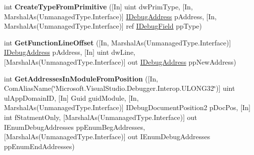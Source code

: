 \begin{DoxyCompactItemize}
\item 
\hypertarget{interface_microsoft_1_1_visual_studio_1_1_debugger_1_1_interop_e_e_1_1_i_debug_com_plus_symbol_provider2_a9f2c354a0835cdd9ece697068c752665}{int {\bfseries Create\+Type\+From\+Primitive} (\mbox{[}In\mbox{]} uint dw\+Prim\+Type, \mbox{[}In, Marshal\+As(Unmanaged\+Type.\+Interface)\mbox{]} \hyperlink{interface_microsoft_1_1_visual_studio_1_1_debugger_1_1_interop_e_e_1_1_i_debug_address}{I\+Debug\+Address} p\+Address, \mbox{[}In, Marshal\+As(Unmanaged\+Type.\+Interface)\mbox{]} ref \hyperlink{interface_microsoft_1_1_visual_studio_1_1_debugger_1_1_interop_e_e_1_1_i_debug_field}{I\+Debug\+Field} pp\+Type)}\label{interface_microsoft_1_1_visual_studio_1_1_debugger_1_1_interop_e_e_1_1_i_debug_com_plus_symbol_provider2_a9f2c354a0835cdd9ece697068c752665}

\item 
\hypertarget{interface_microsoft_1_1_visual_studio_1_1_debugger_1_1_interop_e_e_1_1_i_debug_com_plus_symbol_provider2_ae990ad27eb15d414caa6cee6a966d861}{int {\bfseries Get\+Function\+Line\+Offset} (\mbox{[}In, Marshal\+As(Unmanaged\+Type.\+Interface)\mbox{]} \hyperlink{interface_microsoft_1_1_visual_studio_1_1_debugger_1_1_interop_e_e_1_1_i_debug_address}{I\+Debug\+Address} p\+Address, \mbox{[}In\mbox{]} uint dw\+Line, \mbox{[}Marshal\+As(Unmanaged\+Type.\+Interface)\mbox{]} out \hyperlink{interface_microsoft_1_1_visual_studio_1_1_debugger_1_1_interop_e_e_1_1_i_debug_address}{I\+Debug\+Address} pp\+New\+Address)}\label{interface_microsoft_1_1_visual_studio_1_1_debugger_1_1_interop_e_e_1_1_i_debug_com_plus_symbol_provider2_ae990ad27eb15d414caa6cee6a966d861}

\item 
\hypertarget{interface_microsoft_1_1_visual_studio_1_1_debugger_1_1_interop_e_e_1_1_i_debug_com_plus_symbol_provider2_a54f7b64e9db02fd5d0f11f54b17b7907}{int {\bfseries Get\+Addresses\+In\+Module\+From\+Position} (\mbox{[}In, Com\+Alias\+Name(\char`\"{}Microsoft.\+Visual\+Studio.\+Debugger.\+Interop.\+U\+L\+O\+N\+G32\char`\"{})\mbox{]} uint ul\+App\+Domain\+I\+D, \mbox{[}In\mbox{]} Guid guid\+Module, \mbox{[}In, Marshal\+As(Unmanaged\+Type.\+Interface)\mbox{]} I\+Debug\+Document\+Position2 p\+Doc\+Pos, \mbox{[}In\mbox{]} int f\+Statment\+Only, \mbox{[}Marshal\+As(Unmanaged\+Type.\+Interface)\mbox{]} out I\+Enum\+Debug\+Addresses pp\+Enum\+Beg\+Addresses, \mbox{[}Marshal\+As(Unmanaged\+Type.\+Interface)\mbox{]} out I\+Enum\+Debug\+Addresses pp\+Enum\+End\+Addresses)}\label{interface_microsoft_1_1_visual_studio_1_1_debugger_1_1_interop_e_e_1_1_i_debug_com_plus_symbol_provider2_a54f7b64e9db02fd5d0f11f54b17b7907}


\end{DoxyCompactItemize}
